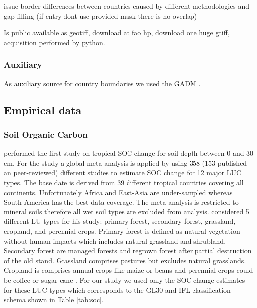 			issue border differences between countries caused by different methodologies and gap filling (if cntry dont use provided mask there is no overlap)

			Is public available as geotiff, download at fao hp, download one huge gtiff, acquisition performed by python.

		\subsubsection{Auxiliary}
			As auxiliary source for country boundaries we used the \ac{GADM} \citep{Hijmans2018}.

	\subsection{Empirical data}
		\subsubsection{Soil Organic Carbon}
			\citeauthor{Don2010} performed the first study on tropical \ac{SOC} change for soil depth between 0 and 30 cm. For the study a global meta-analysis is applied by using 358 (153 published an peer-reviewed) different studies to estimate \ac{SOC} change for 12 major \ac{LUC} types. The base date is derived from 39 different tropical countries covering all continents. Unfortunately Africa and East-Asia are under-sampled whereas South-America has the best data coverage. The meta-analysis is restricted to mineral soils therefore all wet soil types are excluded from analysis. \citeauthor{Don2010} considered 5 different \ac{LU} types for his study: primary forest, secondary forest, grassland, cropland, and perennial crops. Primary forest is defined as natural vegetation without human impacts which includes natural grassland and shrubland. Secondary forest are managed forests and regrown forest after partial destruction of the old stand. Grassland comprises pastures but excludes natural grasslands. Cropland is comprises annual crops like maize or beans and perennial crops could be coffee or sugar cane \citep{Don2010}. For our study we used only the \ac{SOC} change estimates for these \ac{LUC} types which corresponds to the \ac{GL30} and \ac{IFL} classification schema shown in Table \ref{tab:soc}.
